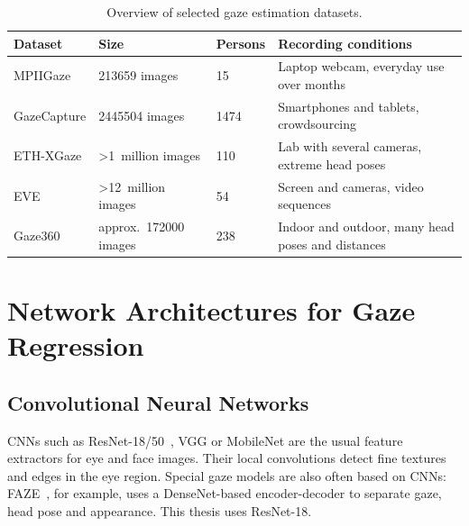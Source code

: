 \begin{table}[htbp]
  \centering
  \small
  \caption{Overview of selected gaze estimation datasets.}
  \label{tab:datensaetze}
  \begin{tabularx}{\textwidth}{L{2.4cm} L{2.6cm} L{2.2cm} Y}
    \toprule
    \textbf{Dataset} & \textbf{Size} & \textbf{Persons} & \textbf{Recording conditions} \\
    \midrule
    MPIIGaze      & \num{213659} images & 15 & Laptop webcam, everyday use over months \\
    GazeCapture   & \num{2445504} images & \num{1474} & Smartphones and tablets, crowdsourcing \\
    ETH-XGaze     & >1~million images & 110 & Lab with several cameras, extreme head poses \\
    EVE           & >12~million images & 54 & Screen and cameras, video sequences \\
    Gaze360       & approx.\ \num{172000} images & 238 & Indoor and outdoor, many head poses and distances \\
    \bottomrule
  \end{tabularx}
\end{table}

\section{Network Architectures for Gaze Regression}
\label{sec:architekturen}
\subsection{Convolutional Neural Networks}
\label{subsec:cnn}
CNNs such as ResNet-18/50~\cite{he2016resnet}, VGG or MobileNet are the usual
feature extractors for eye and face images. Their local convolutions detect
fine textures and edges in the eye region. Special gaze models are also often
based on CNNs: FAZE~\cite{park2019faze}, for example, uses a DenseNet-based
encoder-decoder to separate gaze, head pose and appearance. This thesis uses
ResNet-18.


